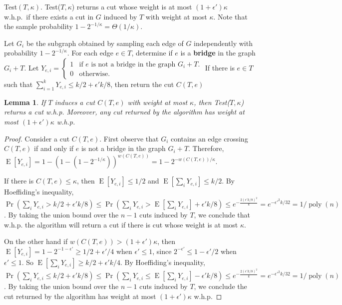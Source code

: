 \documentclass[11pt]{article}
\newtheorem{lemma}[theorem]{Lemma}
\newcommand{\poly}{\operatorname{poly}}
\newcommand{\E}{\operatorname{E}}
\begin{document}
\begin{algorithm}[H]
\caption{Test$(T,\kappa)$. Test($T, \kappa$) returns a cut whose weight is at most $(1+\epsilon') \kappa$ w.h.p.~if there exists a cut in $G$ induced by $T$ with weight at most $\kappa$. Note that the sample probability $1-2^{-1/\kappa} = \Theta(1/\kappa)$.}
\begin{algorithmic}[1]\label{alg:testing}
	\STATE Let $G_i$ be the subgraph obtained by sampling each edge of $G$ independently with probability $1 - 2^{-1/\kappa}$.
	\STATE For each edge $e \in T$, determine if $e$ is a {\bf bridge} in the graph $G_i + T$. \STATE Let $Y_{e,i}=\begin{cases} 1& \mbox{if $e$ is not a bridge in the graph $G_i+T$.} \\ 0 & \mbox{otherwise.}\end{cases} $
\ENDFOR
\STATE If there is $e \in T$ such that $\sum_{i=1}^{k} Y_{e,i} \leq k/2 + \epsilon'k/8$, then return the cut $C(T,e)$
\end{algorithmic}
\end{algorithm}

\begin{lemma} If $T$ induces a cut $C(T,e)$ with weight at most $\kappa$, then Test($T,\kappa$) returns a cut w.h.p. Moreover, any cut returned by the algorithm has weight at most $(1+\epsilon')\kappa$ w.h.p. \end{lemma}

\begin{proof}

Consider a cut $C(T,e)$. First observe that $G_i$ contains an edge crossing $C(T,e)$ if and only if $e$ is not a bridge in the graph $G_i + T$. Therefore, $\E[Y_{e,i}] = 1 - (1 - (1 - 2^{-1/\kappa}))^{w(C(T,e))} = 1 - 2^{-w(C(T,e))/\kappa}$. 

If there is $C(T,e) \leq \kappa$, then $\E[Y_{e,i}] \leq 1/2$ and $\E[\sum_i Y_{e,i}] \leq k/2$. By Hoeffiding's inequality, $\Pr(\sum_i Y_{e,i} > k/2 + \epsilon' k/ 8) \leq \Pr(\sum_i Y_{e,i} > \E[\sum_i Y_{e,i}] + \epsilon' k/ 8) \leq e^{-\frac{2(\epsilon'k/8)^2}{k}} = e^{-\epsilon'^2 k/32} = 1/\poly(n)$. By taking the union bound over the $n-1$ cuts induced by $T$, we conclude that w.h.p. the algorithm will return a cut if there is cut whose weight is at most $\kappa$.

On the other hand if $w(C(T,e)) > (1+\epsilon')\kappa$, then $\E[Y_{e,i}] = 1 - 2^{-{1-\epsilon'}} \geq 1/2 + \epsilon' / 4$ when $\epsilon' \leq 1$, since $2^{-\epsilon'} \leq 1 - \epsilon'/2$ when $\epsilon' \leq 1$. So $\E[\sum_i Y_{e,i}] \geq k/2 + \epsilon'k/ 4$. By Hoeffiding's inequality, $\Pr(\sum_i Y_{e,i} \leq k/2 + \epsilon' k/ 8) \leq \Pr(\sum_i Y_{e,i} \leq \E[\sum_i Y_{e,i}] - \epsilon' k / 8) \leq e^{-\frac{2(\epsilon'k/8)^2}{k}} = e^{-\epsilon'^2 k/32} = 1/\poly(n)$. By taking the union bound over the $n-1$ cuts induced by $T$, we conclude the cut returned by the algorithm has weight at most $(1+\epsilon')\kappa$ w.h.p.
\end{proof}
\end{document}
